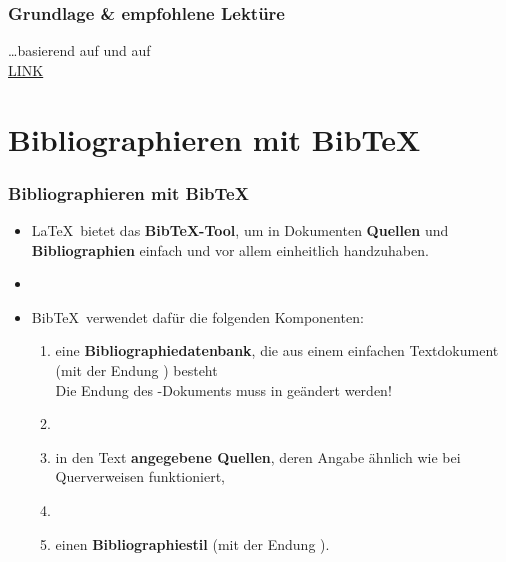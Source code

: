 \begin{frame}
\frametitle{Grundlage \& empfohlene Lektüre}

\dots basierend auf \citet{Freitag&MyP15a} und auf \citet{MyP&Kerkhof16a}\\
\ras \href{https://www.researchgate.net/publication/279514740_LATEX-Einfuhrung_fur_Linguisten}{LINK}

\end{frame}


\section{Bibliographieren mit BibTeX}

\begin{frame}[fragile]
\frametitle{Bibliographieren mit BibTeX}

\begin{itemize}
	\item \LaTeX\ bietet das \textbf{Bib\TeX -Tool}, um in Dokumenten \textbf{Quellen} und \textbf{Bibliographien} einfach und vor allem einheitlich handzuhaben.

	\item[]
	
	\item Bib\TeX\ verwendet dafür die folgenden Komponenten:
	
	\begin{enumerate}
		\item eine \textbf{Bibliographiedatenbank}, die aus einem einfachen Textdokument (mit der Endung ) besteht\\
		Die Endung des -Dokuments muss in \alert{} geändert werden!
		
		\item[]

\pause
		
		\item in den Text \textbf{angegebene Quellen}, deren Angabe ähnlich wie bei Querverweisen funktioniert,
		
		\item[]

\pause 
		
		\item einen \textbf{Bibliographiestil} (mit der Endung ).
	\end{enumerate}

\end{itemize}

\end{frame}


